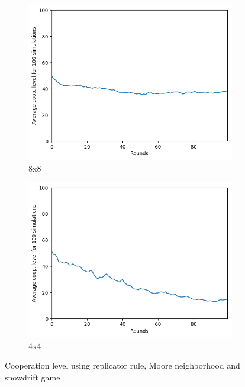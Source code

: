 \documentclass[letterpaper]{article}
\begin{document}
\begin{figure}
\begin{subfigure}{.5\textwidth}
        \centering
        \includegraphics[width=1\linewidth]{images/assign2/8-part2}
        \caption{8x8}
        \label{fig:8moorepart2}
    \end{subfigure}
    \begin{subfigure}{.5\textwidth}
        \centering
        \includegraphics[width=1\linewidth]{images/assign2/4-part2}
        \caption{4x4}
        \label{fig:4moorepart2}
    \end{subfigure}
    \caption{Cooperation level using replicator rule, Moore neighborhood
    and snowdrift game}
    \label{fig:otherpart2}
\end{figure}
\end{document}
